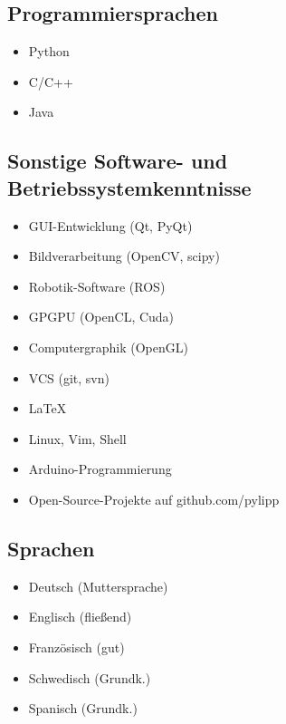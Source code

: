 \documentclass[a4paper,10pt]{memoir}
\begin{document}
\subsection*{Programmiersprachen}
\vspace*{-\baselineskip}
\begin{multicols}{3}
  \begin{itemize}
    \item Python
    \item C/C++
    \item Java
  \end{itemize}
\end{multicols}

\subsection*{Sonstige Software- und Betriebssystemkenntnisse}
\vspace*{-\baselineskip}
\begin{multicols}{2}
  \begin{itemize}
    \item GUI-Entwicklung (Qt, PyQt)
    \item Bildverarbeitung (OpenCV, scipy)
    \item Robotik-Software (ROS)
    \item GPGPU (OpenCL, Cuda)
    \item Computergraphik (OpenGL)
    \item VCS (git, svn)
    \item \LaTeX
    \item Linux, Vim, Shell
    \item Arduino-Programmierung
    \item Open-Source-Projekte auf github.com/pylipp
  \end{itemize}
\end{multicols}

\subsection*{Sprachen}
\vspace*{-\baselineskip}
\begin{multicols}{3}
  \begin{itemize}
    \item Deutsch (Muttersprache)
    \item Englisch (fließend)
    \item Französisch (gut)
    \item Schwedisch (Grundk.)
    \item Spanisch (Grundk.)
  \end{itemize}
\end{multicols}
\end{document}
